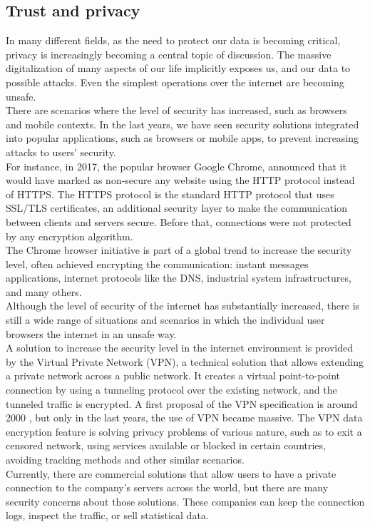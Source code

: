 \documentclass[12pt]{article}
\begin{document}
	\subsection{Trust and privacy}
	In many different fields, as the need to protect our data is becoming critical, privacy is increasingly becoming a central topic of discussion. The massive digitalization of many aspects of our life implicitly exposes us, and our data to possible attacks. Even the simplest operations over the internet are becoming unsafe.\\
	There are scenarios where the level of security has increased, such as browsers and mobile contexts. In the last years, we have seen security solutions integrated into popular applications, such as browsers or mobile apps, to prevent increasing attacks to users' security.\\
	For instance, in 2017, the popular browser Google Chrome, announced that it would have marked as non-secure any website using the HTTP protocol instead of HTTPS. The HTTPS protocol is the standard HTTP protocol that uses SSL/TLS certificates, an additional security layer to make the communication between clients and servers secure. Before that, connections were not protected by any encryption algorithm.\\
	The Chrome browser initiative is part of a global trend to increase the security level, often achieved encrypting the communication: instant messages applications, internet protocols like the DNS, industrial system infrastructures, and many others.\\
	\bigbreak
	Although the level of security of the internet has substantially increased, there is still a wide range of situations and scenarios in which the individual user browsers the internet in an unsafe way.\\
	A solution to increase the security level in the internet environment is provided by the Virtual Private Network (VPN), a technical solution that allows extending a private network across a public network. It creates a virtual point-to-point connection by using a tunneling protocol over the existing network, and the tunneled traffic is encrypted. A first proposal of the VPN specification is around 2000 \cite{VPNRFC}, but only in the last years, the use of VPN became massive. The VPN data encryption feature is solving privacy problems of various nature, such as to exit a censored network, using services available or blocked in certain countries, avoiding tracking methods and other similar scenarios.\\
	Currently, there are commercial solutions that allow users to have a private connection to the company's servers across the world, but there are many security concerns about those solutions. These companies can keep the connection logs, inspect the traffic, or sell statistical data.\\
    
\end{document}

